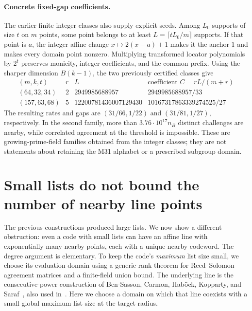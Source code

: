 \documentclass[11pt,letterpaper]{article}
\theoremstyle{definition}
\theoremstyle{remark}
\newcommand{\F}{\mathbb F}
\newcommand{\RS}{\operatorname{RS}}
\begin{document}
\paragraph{Concrete fixed-gap coefficients.}
The earlier finite integer classes also supply explicit seeds.
Among $L_0$ supports of size $t$ on $m$ points, some point belongs
to at least $L=\lceil tL_0/m\rceil$ supports. If that point is $a$,
the integer affine change $x\mapsto2(x-a)+1$ makes it the anchor $1$
and makes every domain point nonzero. Multiplying transformed locator
polynomials by $2^t$ preserves monicity, integer coefficients, and the
common prefix. Using the sharper dimension $B(k-1)$, the two
previously certified classes give
\[
\begin{array}{c|c|c|c}
 (m,k,t)&r&L&\text{coefficient }C=rL/(m+r)\\\hline
 (64,32,34)&2&2949985688957&2949985688957/33\\
 (157,63,68)&5&12200781436007129430&10167317863339274525/27
\end{array}
\]
The resulting rates and gaps are $(31/66,1/22)$ and
$(31/81,1/27)$, respectively. In the second family,
more than $3.76\cdot10^{17}n_B$ distinct challenges are nearby,
while correlated agreement at the threshold is impossible.
These are growing-prime-field families obtained from the integer
classes; they are not statements about retaining the M31 alphabet
or a prescribed subgroup domain.




\section{Small lists do not bound the number of nearby line points}
\label{sec:actual-list}

The previous constructions produced large lists. We now show a different
obstruction: even a code with small lists can have an affine line with
exponentially many nearby points, each with a unique nearby codeword.
The degree argument is elementary. To keep the code's \emph{maximum}
list size small, we choose its evaluation domain using a generic-rank theorem for
Reed--Solomon agreement matrices and a finite-field union bound. The underlying line is the consecutive-power
construction of Ben-Sasson, Carmon, Hab\"ock, Kopparty, and
Saraf~\cite[Theorem~7.1]{bchks}, also used in~\cite{kkh}.
Here we choose a domain on which that line coexists with a small
global maximum list size at the target radius.
\end{document}
